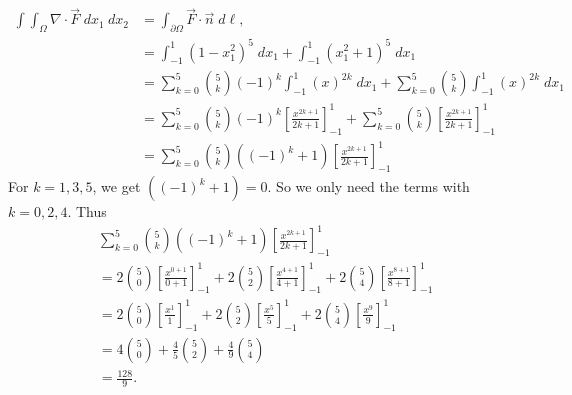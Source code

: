 \documentclass[11pt]{article}
\begin{document}
\begin{solution}
\begin{align*}
        \int \int_{\Omega} \nabla \cdot \vec{F} \;d x_1 \:d x_2 
        &=
        \int_{\partial \Omega}\vec{F}\cdot\vec{n} \;d\ell,
        \\&=
        \int_{-1}^1 (1-x_1^2)^5 \;dx_1 + \int_{-1}^1 (x_1^2 + 1)^ 5 \;dx_1
        \\&=
        \sum_{k = 0}^5 \binom{5}{k} (-1)^{k} \int_{-1}^1 (x)^{2k} \;dx_1 + \sum_{k = 0}^5 \binom{5}{k}\int_{-1}^1 (x)^{2k} \;dx_1
        \\&=
        \sum_{k = 0}^5 \binom{5}{k} (-1)^{k} \left[\frac{x^{2k+1}}{2k+1}\right]_{-1}^1 + \sum_{k = 0}^5 \binom{5}{k} \left[\frac{x^{2k+1}}{2k+1}\right]_{-1}^1
        \\&=
        \sum_{k = 0}^5 \binom{5}{k} \left( (-1)^{k} + 1 \right) 
        \left[\frac{x^{2k+1}}{2k+1}\right]_{-1}^1
    \end{align*}
    For $k = 1, 3, 5$, we get $\left( (-1)^{k} + 1 \right) = 0$. 
    So we only need the terms with $k = 0, 2, 4$.
    Thus
    \begin{align*}
        &
        \sum_{k = 0}^5 \binom{5}{k} \left( (-1)^{k} + 1 \right) 
        \left[\frac{x^{2k+1}}{2k+1}\right]_{-1}^1
        \\&=
        2
        \binom{5}{0}
        \left[\frac{x^{0+1}}{0+1}\right]_{-1}^1
        +
        2
        \binom{5}{2}
        \left[\frac{x^{4+1}}{4+1}\right]_{-1}^1
        +
        2
        \binom{5}{4}
        \left[\frac{x^{8+1}}{8+1}\right]_{-1}^1
        \\&=
        2
        \binom{5}{0}
        \left[\frac{x^{1}}{1}\right]_{-1}^1
        +
        2
        \binom{5}{2}
        \left[\frac{x^{5}}{5}\right]_{-1}^1
        +
        2
        \binom{5}{4}
        \left[\frac{x^{9}}{9}\right]_{-1}^1
        \\&=
        4
        \binom{5}{0}
        +
        \frac 4 5
        \binom{5}{2}
        +
        \frac 4 9
        \binom{5}{4}
        \\&=
        \frac{128}{9}
        .
    \end{align*}
\end{solution}
\end{document}
